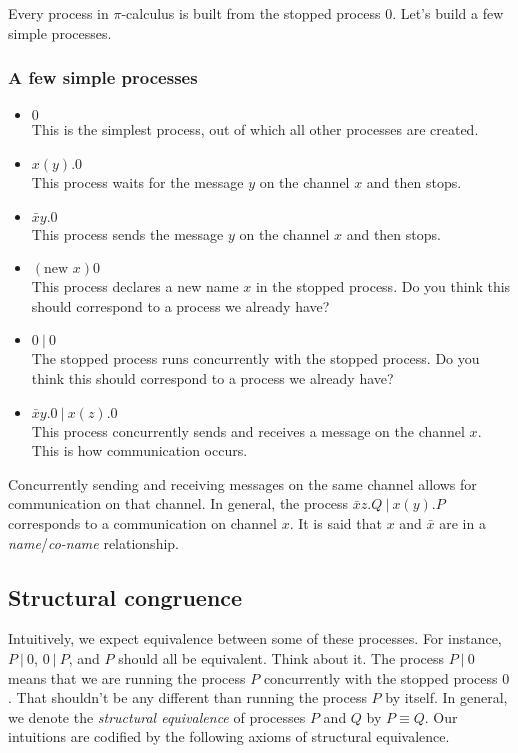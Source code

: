 \documentclass[12pt]{article}
\numberwithin{equation}{section}
\begin{document}
Every process in $\pi$-calculus is built from the stopped process $0$. Let's build a few simple processes.

\subsubsection{A few simple processes}
\begin{itemize}
\item $0$ \\
This is the simplest process, out of which all other processes are created.

\item $x(y).0$ \\
This process waits for the message $y$ on the channel $x$ and then stops.

\item $\bar{x} y .0$ \\
This process sends the message $y$ on the channel $x$ and then stops.

\item $(\text{new } x)0$ \\
This process declares a new name $x$ in the stopped process. Do you think this should correspond to a process we already have?

\item $0 \ | \ 0$ \\
The stopped process runs concurrently with the stopped process. Do you think this should correspond to a process we already have?

\item $\bar{x} y .0 \ | \ x(z).0$ \\
This process concurrently sends and receives a message on the channel $x$. This is how communication occurs.
\end{itemize}

Concurrently sending and receiving messages on the same channel allows for communication on that channel. In general, the process $\bar{x} z .Q \ | \ x(y).P$ corresponds to a communication on channel $x$. It is said that $x$ and $\bar{x}$ are in a \emph{name}/\emph{co-name} relationship.


\subsection{Structural congruence}
Intuitively, we expect equivalence between some of these processes. For instance, $P \ | \ 0$, $0 \ | \ P$, and $P$ should all be equivalent. Think about it. The process $P \ | \ 0$ means that we are running the process $P$ concurrently with the stopped process $0$. That shouldn't be any different than running the process $P$ by itself. In general, we denote the \emph{structural equivalence} of processes $P$ and $Q$ by $P \equiv Q$. Our intuitions are codified by the following axioms of structural equivalence.
\end{document}
